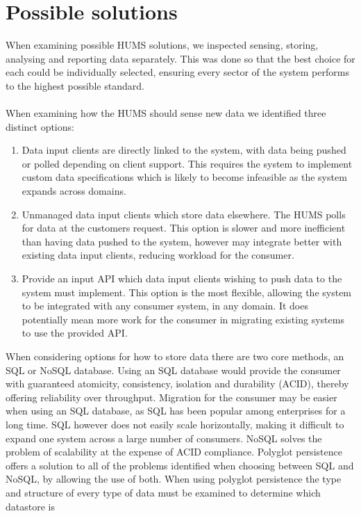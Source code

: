 \documentclass[10pt,a4paper]{article}
\begin{document}
\section{Possible solutions}
When examining possible HUMS solutions, we inspected sensing, storing, analysing
and reporting data separately. This was done so that the best choice for each
could be individually selected, ensuring every sector of the system performs to
the highest possible standard. 
\\ \\
When examining how the HUMS should sense new data we identified three distinct
options:
\begin{enumerate}
\item Data input clients are directly linked to the system, with data being
pushed or polled depending on client support. This requires the system to
implement custom data specifications which is likely to become infeasible as the
system expands across domains.
\item Unmanaged data input clients which store data elsewhere. The HUMS polls
for data at the customers request. This option is slower and more inefficient
than having data pushed to the system, however may integrate better with
existing data input clients, reducing workload for the consumer.
\item Provide an input API which data input clients wishing to push data to the
system must implement. This option is the most flexible, allowing the system to
be integrated with any consumer system, in any domain. It does potentially mean
more work for the consumer in migrating existing systems to use the provided
API. \\
\end{enumerate}
When considering options for how to store data there are two core methods, an
SQL or NoSQL database. Using an SQL database would provide the consumer with
guaranteed atomicity, consistency, isolation and durability (ACID), thereby
offering reliability over throughput. Migration for the consumer may be easier
when using an SQL database, as SQL has been popular among enterprises for a long
time. SQL however does not easily scale horizontally, making it difficult to
expand one system across a large number of consumers. NoSQL solves the problem
of scalability at the expense of ACID compliance. Polyglot persistence offers a
solution to all of the problems identified when choosing between SQL and NoSQL,
by allowing the use of both. When using polyglot persistence the type and
structure of every type of data must be examined to determine which datastore is
\end{document}
